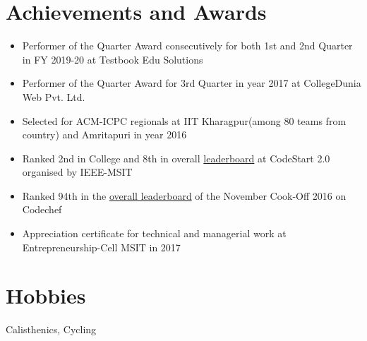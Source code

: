 \documentclass[margin, centered]{res}
\begin{document}
\begin{resume}
\section{Achievements and Awards}
\begin{itemize}[leftmargin=*] 
 \item Performer of the Quarter Award consecutively for both 1st and 2nd Quarter in FY 2019-20 at Testbook Edu Solutions
 \item Performer of the Quarter Award for 3rd Quarter in year 2017 at CollegeDunia Web Pvt. Ltd.
 \item Selected for ACM-ICPC regionals at IIT Kharagpur(among 80 teams from country) and Amritapuri in year 2016
 \item Ranked 2nd in College and 8th in overall \href {https://www.hackerearth.com/CodeStart2/leaderboard/}{leaderboard} at CodeStart 2.0 organised by IEEE-MSIT
 \item Ranked 94th in the \href {https://www.codechef.com/rankings/COOK76}{overall leaderboard} of the November Cook-Off 2016 on Codechef
 \item Appreciation certificate for technical and managerial work at Entrepreneurship-Cell MSIT in 2017
\end{itemize}


\section{Hobbies}
Calisthenics, Cycling

\end{resume}
\end{document}
